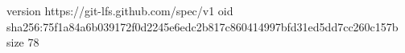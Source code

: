 version https://git-lfs.github.com/spec/v1
oid sha256:75f1a84a6b039172f0d2245e6edc2b817c860414997bfd31ed5dd7cc260c157b
size 78
